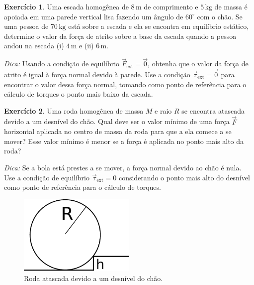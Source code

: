 \documentclass[12pt,a4paper]{article}
\theoremstyle{definition}
\newtheorem{ex}{Exercício}[section]
\begin{document}
\begin{ex}
  Uma escada homogênea de $8\,\mathrm{m}$ de comprimento e
  $5\,\mathrm{kg}$ de massa é apoiada em uma parede vertical lisa
  fazendo um ângulo de $60^\circ$ com o chão. Se uma pessoa de
  $70\,\mathrm{kg}$ está sobre a escada e ela se encontra em
  equilíbrio estático, determine o valor da força de atrito sobre a
  base da escada quando a pessoa andou na escada (i) $4\,\mathrm{m}$ e
  (ii) $6\,\mathrm{m}$.

  \noindent\textit{Dica:} Usando a condição de equilíbrio $\vec F_{\textrm{ext}}=\vec 0$, obtenha
  que o valor da força de atrito é igual à força normal devido à
  parede. Use a condição $\vec\tau_\textrm{ext}=\vec 0$ para encontrar o
  valor dessa força normal, tomando como ponto de referência para o
  cálculo de torques o ponto mais baixo da escada.
\end{ex}

\begin{ex}
  Uma roda homogênea de massa $M$ e raio $R$ se encontra atascada
  devido a um desnível do chão. Qual deve ser o valor mínimo de uma
  força $\vec F$ horizontal aplicada no centro de massa da roda para
  que a ela comece a se mover? Esse valor mínimo é menor se a força é
  aplicada no ponto mais alto da roda?

  \noindent\textit{Dica:} Se a bola está prestes a se mover, a força
  normal devido ao chão é nula. Use a condição de equilíbrio
  $\vec\tau_{\mathrm{ext}}=0$ considerando o ponto mais alto do
  desnível como ponto de referência para o cálculo de torques.
  \begin{figure}[t]
    \centering
    \includegraphics[width=0.5\textwidth,keepaspectratio]{aux/roda_obstaculo.pdf}
    \caption{Roda atascada devido a um desnível do chão.}
    \label{fig:roda_obstaculo}
  \end{figure}
\end{ex}
\end{document}
